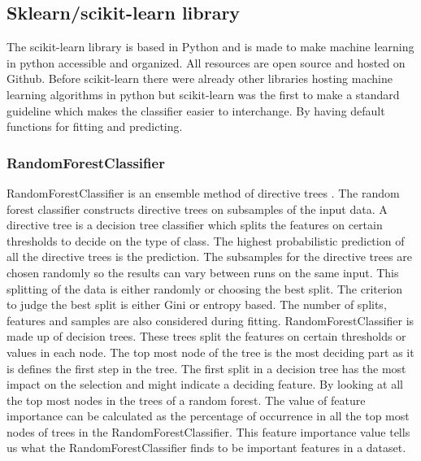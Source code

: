\documentclass[a4paper,10pt]{article}
\begin{document}
\subsection{Sklearn/scikit-learn library}
The scikit-learn library is based in Python and is made to make machine learning in python accessible and organized. 
All resources are open source and hosted on Github. Before scikit-learn there were already other libraries hosting machine learning algorithms in python but scikit-learn was the first to make a standard guideline which makes the classifier easier to interchange. By having default functions for fitting and predicting.


\subsubsection{RandomForestClassifier}
RandomForestClassifier is an ensemble method of directive trees \cite{RDF}. The random forest classifier constructs directive trees on subsamples of the input data.  A directive tree is a decision tree classifier which splits the features on certain thresholds to decide on the type of class. The highest probabilistic prediction of all the directive trees is the prediction. The subsamples for the directive trees are chosen randomly so the results can vary between runs on the same input. This splitting of the data is either randomly or choosing the best split. The criterion to judge the best split is either Gini or entropy based. The number of splits, features and samples are also considered during fitting. 
RandomForestClassifier is made up of decision trees. These trees split the features on certain thresholds or values in each node. The top most node of the tree is the most deciding part as it is defines the first step in the tree. The first split in a decision tree has the most impact on the selection and might indicate a deciding feature. By looking at all the top most nodes in the trees of a random forest. The value of feature importance can be calculated as the percentage of occurrence in all the top most nodes of trees in the RandomForestClassifier. This feature importance value tells us what the RandomForestClassifier finds to be important features in a dataset.
\end{document}
